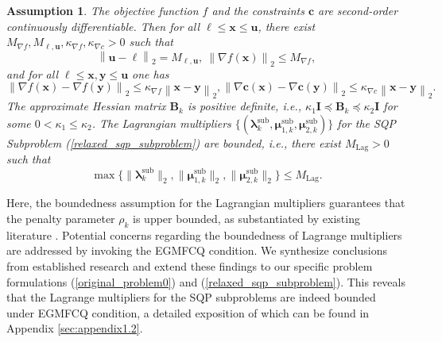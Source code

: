 \documentclass[aos]{imsart}
\numberwithin{equation}{section}
\theoremstyle{plain}
\newtheorem{assumption}{Assumption}
\begin{document}
\begin{assumption}
    \label{assump2}
    The objective function $f$ and the constraints $\bm{c}$ are second-order continuously differentiable. Then for all $\bm{\ell} \leq \bm{x} \leq \bm{u}$, there exist $M_{\nabla f}, M_{\bm{\ell},\bm{u}}, \kappa_{\nabla f}, \kappa_{\nabla c}>0$ such that
    \begin{equation*}
        \left\|\bm{u} - \bm{\ell} \right\|_2 = M_{\bm{\ell},\bm{u}},~\left\| \nabla f(\bm{x})\right\|_2 \leq M_{\nabla f},
    \end{equation*}
    and for all $\bm{\ell} \leq \bm{x}, \bm{y} \leq \bm{u}$ one has
    \begin{equation*}
        \left\|\nabla f(\bm{x})-\nabla f(\bm{y}) \right\|_2 \leq \kappa_{\nabla f} \left\|\bm{x} - \bm{y} \right\|_2, \left\|\nabla \bm{c}(\bm{x})-\nabla \bm{c}(\bm{y}) \right\|_2 \leq \kappa_{\nabla c} \left\|\bm{x} - \bm{y} \right\|_2.
    \end{equation*}
    The approximate Hessian matrix $\bm{B}_k$ is positive definite, i.e., $\kappa_1 \mathbf{I} \preceq \bm{B}_k \preceq \kappa_2 \mathbf{I}$ for some $0<\kappa_1 \leq \kappa_2$. The Lagrangian multipliers $\{(\bm{\lambda}_{k}^{\text{sub}},  \bm{\mu}_{1,k}^{\text{sub}}, \bm{\mu}_{2,k}^{\text{sub}})\}$ for the SQP Subproblem (\ref{relaxed_sqp_subproblem}) are bounded, i.e., there exist $M_{\text{Lag}}>0$ such that 
    \begin{equation*}
        \max\{\|\bm{\lambda}_{k}^{\text{sub}}\|_2, \|\bm{\mu}_{1,k}^{\text{sub}}\|_2, \|\bm{\mu}_{2,k}^{\text{sub}}\|_2\} \leq M_{\text{Lag}}.
    \end{equation*}
\end{assumption}


Here, the boundedness assumption for the Lagrangian multipliers guarantees that the penalty parameter $\rho_k$ is upper bounded, as substantiated by existing literature \cite{burke1989robust, bertsekas1997nonlinear}. 
Potential concerns regarding the boundedness of Lagrange multipliers are addressed by invoking the EGMFCQ condition.  We synthesize conclusions from established research \cite{burke1989robust, gauvin1977necessary} and extend these findings to our specific problem formulations (\ref{original_problem0}) and (\ref{relaxed_sqp_subproblem}).
This reveals that the Lagrange multipliers for the SQP subproblems are indeed bounded under EGMFCQ condition, a detailed exposition of which can be found in Appendix \ref{sec:appendix1.2}.
\end{document}
